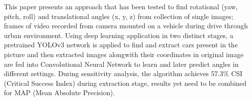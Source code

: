 
This paper presents an approach that has been tested to find rotational (yaw, pitch, roll) and translational angles (x, y, z) from collection of single images; frames of video recorded from camera mounted on a vehicle during drive through urban environment. Using deep learning application in two distinct stages, a pretrained YOLOv3 network is applied to find and extract cars present in the picture and then extracted images alongwith their coordinates in original image are fed into Convolutional Neural Network to learn and later predict angles in different settings. During sensitivity analysis, the algorithm achieves 57.3\% CSI (Critical Success Index) \parencite{schaefer1990criticalSuccessIndex} during extraction stage, results yet need to be combined for MAP (Mean Absolute Precision).
